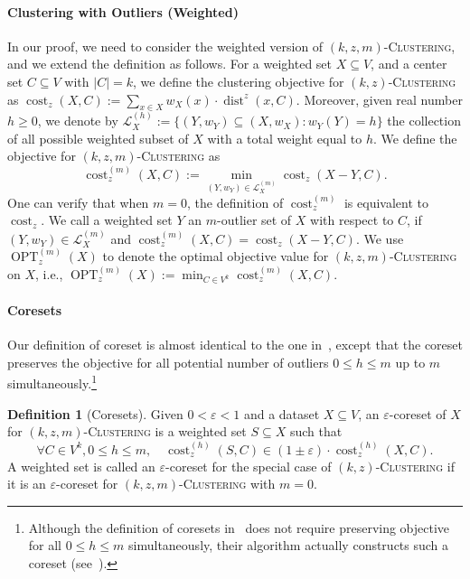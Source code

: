 \documentclass[letterpaper,11pt]{article}
\theoremstyle{plain}
\theoremstyle{definition}
\newtheorem{definition}[theorem]{Definition}
\theoremstyle{remark}
\DeclareMathOperator{\cost}{cost}
\DeclareMathOperator{\OPT}{OPT}
\DeclareMathOperator{\dist}{dist}
\newcommand{\eps}{\varepsilon}
\newcommand{\calL}{\mathcal{L}}
\newcommand{\ProblemName}[1]{\textsc{#1}}
\newcommand{\kzC}{\ProblemName{$(k,z)$-Clustering}\xspace}
\newcommand{\kzmC}{\ProblemName{$(k,z,m)$-Clustering}\xspace}
\begin{document}
\paragraph{Clustering with Outliers (Weighted)}
In our proof, we need to consider the weighted version of \kzmC, and we extend the definition as follows.
For a weighted set $X\subseteq V$, and a center set $C\subseteq V$ with $|C|=k$, we define the clustering objective for \kzC as $\cost_z(X,C):=\sum_{x\in X}w_X(x)\cdot \dist^z(x,C)$. 
Moreover, given real number $h \ge 0$, we denote by $\calL_X^{(h)}:=\{(Y,w_Y)\subseteq (X,w_X): w_Y(Y) = h\}$ the collection of all possible weighted subset of $X$ with a total weight equal to $h$. 
We define the objective for \kzmC as 
\begin{equation}
    \label{eq:costm}
    \cost_z^{(m)}(X,C):=\min_{(Y,w_Y)\in\calL_X^{(m)}} \cost_z(X - Y,C).
\end{equation}
One can verify that when $m=0$, the definition of $\cost_z^{(m)}$ is equivalent to $\cost_z$.
We call a weighted set $Y$ an $m$-outlier set of $X$ with respect to $C$, if $(Y,w_Y)\in\calL_X^{(m)}$ and $\cost_z^{(m)}(X,C) = \cost_z(X-Y,C)$. 
We use $\OPT_z^{(m)}(X)$ to denote the optimal objective value for \kzmC on $X$, i.e., $\OPT_z^{(m)}(X):=\min_{C\in V^k} \cost_z^{(m)}(X,C)$.

\paragraph{Coresets} 
Our definition of coreset is almost identical to the one in~\cite[Definition 2.1]{Huang2022Near-optimal}, except that the coreset preserves the objective for all potential number of outliers $0 \leq h \leq m$ up to $m$ simultaneously.\footnote{Although the definition of coresets in~\cite{Huang2022Near-optimal} does not require preserving objective for all $0\le h\le m$ simultaneously, their algorithm actually constructs such a coreset (see~\cite[Remark 3.2]{Huang2022Near-optimal}).}

\begin{definition}[Coresets]
    Given $0<\eps<1$ and a dataset $X\subseteq V$, an $\eps$-coreset of $X$ for \kzmC is a weighted set $S\subseteq X$ such that
    \begin{equation*}
        \forall C\in V^k, 0\le h\le m, \quad \cost_z^{(h)}(S,C) \in(1\pm\eps)\cdot \cost_z^{(h)}(X,C).
    \end{equation*} 
    A weighted set is called an $\eps$-coreset for the special case of \kzC
    if it is an $\eps$-coreset for \kzmC with $m = 0$.
\end{definition}
\end{document}

